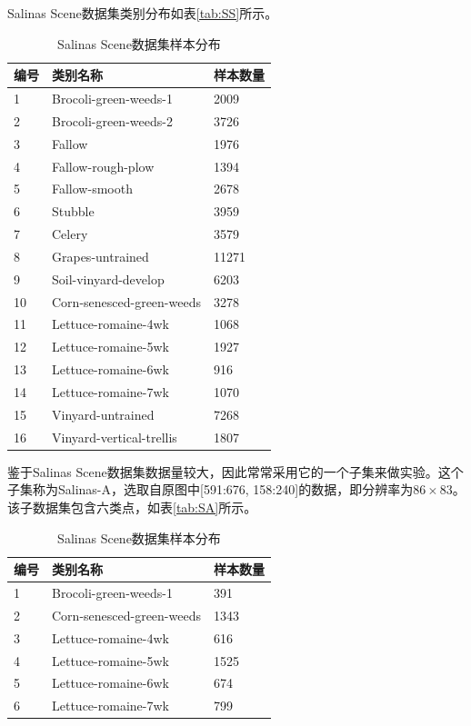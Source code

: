 \documentclass[12pt,a4paper]{article}
\begin{document}
Salinas Scene数据集类别分布如表\eqref{tab:SS}所示。
\begin{table}[h]
\centering
\caption{Salinas Scene数据集样本分布}\label{tab:SS}
\begin{tabu} to 1\textwidth{X[c]X[10,c]X[3,c]}
\hline
编号 & 类别名称 & 样本数量\\
 & Brocoli-green-weeds-1 & 2009 \\
2 & Brocoli-green-weeds-2 & 3726 \\
3 & Fallow & 1976 \\
4 & Fallow-rough-plow & 1394 \\
5 & Fallow-smooth & 2678 \\
6 & Stubble & 3959 \\
7 & Celery & 3579 \\
8 & Grapes-untrained & 11271 \\
9 & Soil-vinyard-develop & 6203 \\
10 & Corn-senesced-green-weeds & 3278 \\
11 & Lettuce-romaine-4wk & 1068 \\
12 & Lettuce-romaine-5wk & 1927 \\
13 & Lettuce-romaine-6wk & 916 \\
14 & Lettuce-romaine-7wk & 1070 \\
15 & Vinyard-untrained & 7268 \\
16 & Vinyard-vertical-trellis & 1807\\
\hline
\end{tabu}
\end{table}

鉴于Salinas Scene数据集数据量较大，因此常常采用它的一个子集来做实验。这个子集称为Salinas-A，选取自原图中[591:676, 158:240]的数据，即分辨率为$86 \times 83$。该子数据集包含六类点，如表\eqref{tab:SA}所示。
\begin{table}[h]
\centering
\caption{Salinas Scene数据集样本分布}\label{tab:SA}
\begin{tabu} to 1\textwidth{X[c]X[10,c]X[3,c]}
\hline
编号 & 类别名称 & 样本数量\\
 & Brocoli-green-weeds-1 & 391 \\
2 & Corn-senesced-green-weeds & 1343 \\
3 & Lettuce-romaine-4wk & 	616 \\
4 & Lettuce-romaine-5wk	 & 1525 \\
5 & Lettuce-romaine-6wk & 	674 \\
6 & Lettuce-romaine-7wk	 & 799 \\
\hline
\end{tabu}
\end{table}
\end{document}
